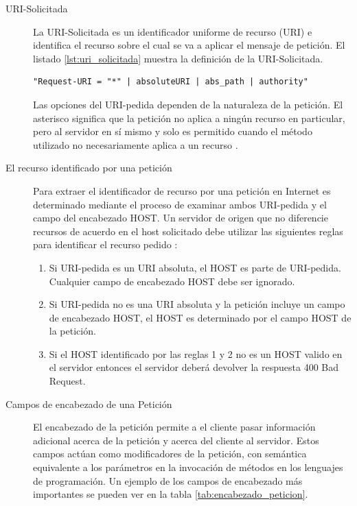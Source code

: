 \begin{description}
\item[URI-Solicitada]
La URI-Solicitada es un identificador uniforme de recurso (URI) e identifica el recurso sobre el cual se va a aplicar el mensaje de petición. El listado \ref{lst:uri_solicitada} muestra la definición de la URI-Solicitada.

\begin{lstlisting}[caption={URI-Solicitada},label={lst:uri_solicitada}]
"Request-URI = "*" | absoluteURI | abs_path | authority"
\end{lstlisting}

Las opciones del URI-pedida dependen de la naturaleza de la petición. El asterisco significa que la petición no aplica a ningún recurso en particular, pero al servidor en sí mismo y solo es permitido cuando el método utilizado no necesariamente aplica a un recurso \cite{rfc2616}.

\item[El recurso identificado por una petición]

Para extraer el identificador de recurso por una petición en Internet es determinado mediante el proceso de examinar ambos URI-pedida y el campo del encabezado HOST.
Un servidor de origen que no diferencie recursos de acuerdo en el host solicitado debe utilizar las siguientes reglas para identificar el recurso pedido \cite{rfc2616}:
\begin{enumerate}
\item Si URI-pedida es un URI absoluta, el HOST es parte de URI-pedida. Cualquier campo de encabezado HOST debe ser ignorado.
\item Si URI-pedida no es una URI absoluta y la petición incluye un campo de encabezado HOST, el HOST es determinado por el campo HOST de la petición. 
\item Si el HOST identificado por las reglas 1 y 2 no es un HOST valido en el servidor entonces el servidor deberá devolver la respuesta 400 Bad Request.
\end{enumerate}

\item[Campos de encabezado de una Petición]

El encabezado de la petición permite a el cliente pasar información adicional acerca de la petición y acerca del cliente al servidor. Estos campos actúan como modificadores de la petición, con semántica equivalente a los parámetros en la invocación de métodos en los lenguajes de programación. Un ejemplo de los campos de encabezado más importantes se pueden ver en la tabla \ref{tab:encabezado_peticion}.


\end{description}
